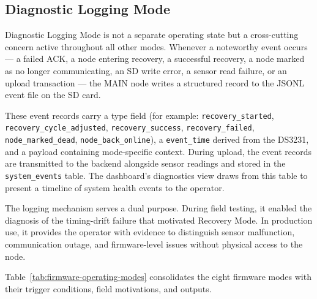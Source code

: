 \subsection{Diagnostic Logging Mode}
\label{sec:mode-diagnostic}

Diagnostic Logging Mode is not a separate operating state but a cross-cutting concern active throughout all other modes. Whenever a noteworthy event occurs — a failed ACK, a node entering recovery, a successful recovery, a node marked as no longer communicating, an SD write error, a sensor read failure, or an upload transaction — the MAIN node writes a structured record to the JSONL event file on the SD card.

These event records carry a type field (for example: \texttt{recovery\_started}, \texttt{recovery\_cycle\_adjusted}, \texttt{recovery\_success}, \texttt{recovery\_failed}, \texttt{node\_marked\_dead}, \texttt{node\_back\_online}), a \texttt{event\_time} derived from the DS3231, and a payload containing mode-specific context. During upload, the event records are transmitted to the backend alongside sensor readings and stored in the \texttt{system\_events} table. The dashboard's diagnostics view draws from this table to present a timeline of system health events to the operator.

The logging mechanism serves a dual purpose. During field testing, it enabled the diagnosis of the timing-drift failure that motivated Recovery Mode. In production use, it provides the operator with evidence to distinguish sensor malfunction, communication outage, and firmware-level issues without physical access to the node.

\bigskip

Table~\ref{tab:firmware-operating-modes} consolidates the eight firmware modes with their trigger conditions, field motivations, and outputs.

